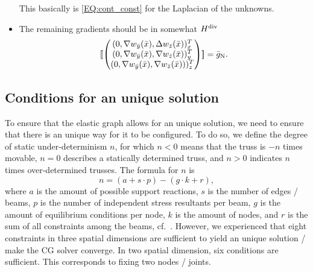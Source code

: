\documentclass[a4paper, english, 12pt, reqno, draft]{amsart}
\theoremstyle{definition}
\theoremstyle{remark}
\numberwithin{equation}{section}
\newcommand{\jump}[1]{{[\![ #1 ]\!]}}
\begin{document}
\begin{itemize}
\begin{equation*}
 \end{equation*}
 This basically is \eqref{EQ:cont_const} for the Laplacian of the unknowns.
 \item The remaining gradients should be in somewhat $H^\textup{div}$
 \begin{equation*}
  \jump{ \begin{pmatrix} (0, \nabla w_{\bar y}(\bar x), \Delta w_{\bar z}(\bar x))^T_x \\ (0, \nabla w_{\bar y}(\bar x), \nabla w_{\bar z}(\bar x))^T_y \\ (0, \nabla w_{\bar y}(\bar x), \nabla w_{\bar z}(\bar x)))^T_z \end{pmatrix} } = \bar g_\text N.
 \end{equation*}
\end{itemize}
% 
\subsection{Conditions for an unique solution}
% 
To ensure that the elastic graph allows for an unique solution, we need to ensure that there is an unique way for it to be configured. To do so, we define the degree of static under-determinism $n$, for which $n < 0$ means that the truss is $-n$ times movable, $n = 0$ describes a statically determined truss, and $n > 0$ indicates $n$ times over-determined trusses. The formula for $n$ is
% 
\begin{equation}
 n = (a + s \cdot p) - (g \cdot k + r),
\end{equation}
% 
where $a$ is the amount of possible support reactions, $s$ is the number of edges / beams, $p$ is the number of independent stress resultants per beam, $g$ is the amount of equilibrium conditions per node, $k$ is the amount of nodes, and $r$ is the sum of all constraints among the beams, cf.\ \cite[Sect.\ 2.2]{MeskourisH2013}. However, we experienced that eight constraints in three spatial dimensions are sufficient to yield an unique solution / make the CG solver converge. In two spatial dimension, six conditions are sufficient. This corresponds to fixing two nodes / joints.


\newpage
% 


% 
\end{document}
